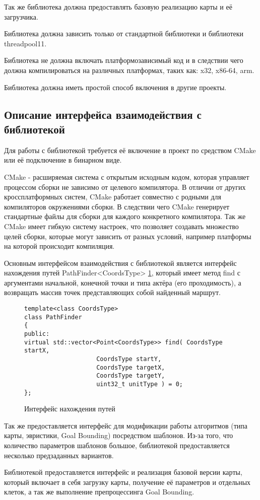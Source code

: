 Так же библиотека должна предоставлять базовую реализацию карты и её загрузчика.

Библиотека должна зависить только от стандартной библиотеки и библиотеки threadpool11.

Библиотека не должна включать платформозависимый код и в следствии чего должна компилироваться на различных платформах, таких как: x32, x86-64, arm.

Библиотека должна иметь простой способ включения в другие проекты.   

\subsection{Описание интерфейса взаимодействия с библиотекой}

Для работы с библиотекой требуется её включение в проект по средством CMake или её подключение в бинарном виде. 

CMake - расширяемая система с открытым исходным кодом, которая управляет процессом сборки не зависимо от целевого компилятора. В отличии от других кроссплатформных систем, CMake работает совместно с родными для компиляторов окружениями сборки. В следствии чего CMake генерирует стандартные файлы для сборки для каждого конкретного компилятора.
Так же CMake имеет гибкую систему настроек, что позволяет создавать множество целей сборки, которые могут зависить от разных условий, например платформы на которой происходит компиляция.

Основным интерфейсом взаимодействия с библиотекой является интерфейс нахождения путей PathFinder<CoordsType> \cref{fig:path_finding_interface}, который имеет метод find с аргументами начальной, конечной точки и типа актёра (его проходимость), а возвращать массив точек представляющих собой найденный маршрут.

\begin{figure}[!htb]
	\centering
	\captionsetup{justification=centering}
	\begin{lstlisting}
template<class CoordsType>
class PathFinder
{
public:
virtual std::vector<Point<CoordsType>> find( CoordsType startX, 
					CoordsType startY,
					CoordsType targetX,
					CoordsType targetY,
					uint32_t unitType ) = 0;
};
	\end{lstlisting}
	\caption{Интерфейс нахождения путей}
	\label{fig:path_finding_interface}
\end{figure}

Так же предоставляется интерфейс для модификации работы алгоритмов (типа карты, эвристики, Goal Bounding) посредством шаблонов. Из-за того, что количество параметров шаблонов большое, библиотекой предоставляется несколько предзаданных вариантов.

Библиотекой предоставляется интерфейс и реализация базовой версии карты, который включает в себя загрузку карты, получение её параметров и отдельных клеток, а так же выполнение препроцессинга Goal Bounding.   
